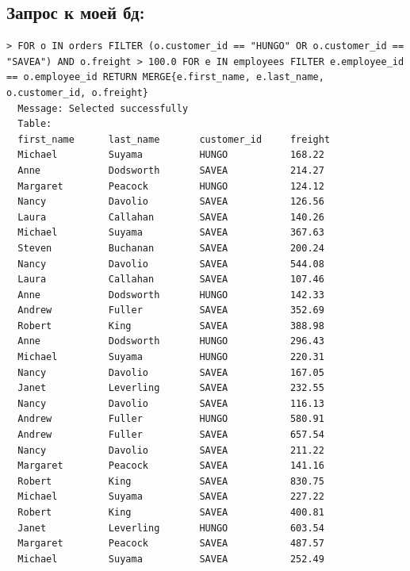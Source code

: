 \documentclass[12pt,onecolumn]{article}
\begin{document}
\subsection{Запрос к моей бд:}
\begin{lstlisting}[style=bash]
  > FOR o IN orders FILTER (o.customer_id == "HUNGO" OR o.customer_id == "SAVEA") AND o.freight > 100.0 FOR e IN employees FILTER e.employee_id == o.employee_id RETURN MERGE{e.first_name, e.last_name, o.customer_id, o.freight}
  Message: Selected successfully
  Table:
  first_name      last_name       customer_id     freight        
  Michael         Suyama          HUNGO           168.22         
  Anne            Dodsworth       SAVEA           214.27         
  Margaret        Peacock         HUNGO           124.12         
  Nancy           Davolio         SAVEA           126.56         
  Laura           Callahan        SAVEA           140.26         
  Michael         Suyama          SAVEA           367.63         
  Steven          Buchanan        SAVEA           200.24         
  Nancy           Davolio         SAVEA           544.08         
  Laura           Callahan        SAVEA           107.46         
  Anne            Dodsworth       HUNGO           142.33         
  Andrew          Fuller          SAVEA           352.69         
  Robert          King            SAVEA           388.98         
  Anne            Dodsworth       HUNGO           296.43         
  Michael         Suyama          HUNGO           220.31         
  Nancy           Davolio         SAVEA           167.05         
  Janet           Leverling       SAVEA           232.55         
  Nancy           Davolio         SAVEA           116.13         
  Andrew          Fuller          HUNGO           580.91         
  Andrew          Fuller          SAVEA           657.54         
  Nancy           Davolio         SAVEA           211.22         
  Margaret        Peacock         SAVEA           141.16         
  Robert          King            SAVEA           830.75         
  Michael         Suyama          SAVEA           227.22         
  Robert          King            SAVEA           400.81         
  Janet           Leverling       HUNGO           603.54         
  Margaret        Peacock         SAVEA           487.57         
  Michael         Suyama          SAVEA           252.49        
\end{lstlisting}
\end{document}
